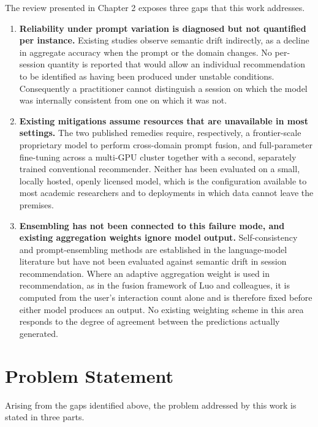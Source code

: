 \documentclass[12pt,a4paper,oneside]{report}
\begin{document}
The review presented in Chapter 2 exposes three gaps that this work addresses.

\begin{enumerate}[leftmargin=*]
\item \textbf{Reliability under prompt variation is diagnosed but not
quantified per instance.} Existing studies observe semantic drift indirectly, as
a decline in aggregate accuracy when the prompt or the domain changes. No
per-session quantity is reported that would allow an individual recommendation
to be identified as having been produced under unstable conditions. Consequently
a practitioner cannot distinguish a session on which the model was internally
consistent from one on which it was not.

\item \textbf{Existing mitigations assume resources that are unavailable in
most settings.} The two published remedies require, respectively, a
frontier-scale proprietary model to perform cross-domain prompt fusion, and
full-parameter fine-tuning across a multi-GPU cluster together with a second,
separately trained conventional recommender. Neither has been evaluated on a
small, locally hosted, openly licensed model, which is the configuration
available to most academic researchers and to deployments in which data cannot
leave the premises.

\item \textbf{Ensembling has not been connected to this failure mode, and
existing aggregation weights ignore model output.} Self-consistency and
prompt-ensembling methods are established in the language-model literature but
have not been evaluated against semantic drift in session recommendation. Where
an adaptive aggregation weight is used in recommendation, as in the fusion
framework of Luo and colleagues, it is computed from the user's interaction
count alone and is therefore fixed before either model produces an output. No
existing weighting scheme in this area responds to the degree of agreement
between the predictions actually generated.
\end{enumerate}

\chapter{Problem Statement}

Arising from the gaps identified above, the problem addressed by this work is
stated in three parts.
\end{document}
